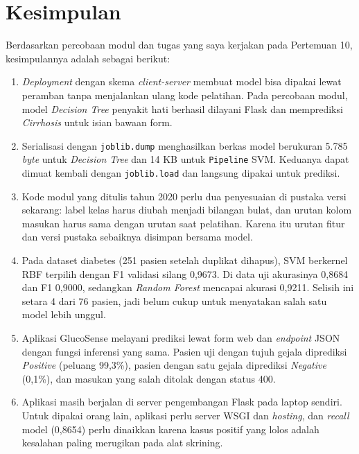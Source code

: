 \documentclass[a4paper,oneside,12pt]{report}
\begin{document}
\clearpage

\chapter{Kesimpulan}
Berdasarkan percobaan modul dan tugas yang saya kerjakan pada Pertemuan 10, kesimpulannya adalah sebagai berikut:
\begin{enumerate}[noitemsep, topsep=2pt, parsep=1pt]
	\item \textit{Deployment} dengan skema \textit{client-server} membuat model bisa dipakai lewat peramban tanpa menjalankan ulang kode pelatihan. Pada percobaan modul, model \textit{Decision Tree} penyakit hati berhasil dilayani Flask dan memprediksi \textit{Cirrhosis} untuk isian bawaan form.
	\item Serialisasi dengan \texttt{joblib.dump} menghasilkan berkas model berukuran 5.785 \textit{byte} untuk \textit{Decision Tree} dan 14 KB untuk \texttt{Pipeline} SVM. Keduanya dapat dimuat kembali dengan \texttt{joblib.load} dan langsung dipakai untuk prediksi.
	\item Kode modul yang ditulis tahun 2020 perlu dua penyesuaian di pustaka versi sekarang: label kelas harus diubah menjadi bilangan bulat, dan urutan kolom masukan harus sama dengan urutan saat pelatihan. Karena itu urutan fitur dan versi pustaka sebaiknya disimpan bersama model.
	\item Pada dataset diabetes (251 pasien setelah duplikat dihapus), SVM berkernel RBF terpilih dengan F1 validasi silang 0,9673. Di data uji akurasinya 0,8684 dan F1 0,9000, sedangkan \textit{Random Forest} mencapai akurasi 0,9211. Selisih ini setara 4 dari 76 pasien, jadi belum cukup untuk menyatakan salah satu model lebih unggul.
	\item Aplikasi GlucoSense melayani prediksi lewat form web dan \textit{endpoint} JSON dengan fungsi inferensi yang sama. Pasien uji dengan tujuh gejala diprediksi \textit{Positive} (peluang 99,3\%), pasien dengan satu gejala diprediksi \textit{Negative} (0,1\%), dan masukan yang salah ditolak dengan status 400.
	\item Aplikasi masih berjalan di server pengembangan Flask pada laptop sendiri. Untuk dipakai orang lain, aplikasi perlu server WSGI dan \textit{hosting}, dan \textit{recall} model (0,8654) perlu dinaikkan karena kasus positif yang lolos adalah kesalahan paling merugikan pada alat skrining.
\end{enumerate}

\clearpage
\end{document}
